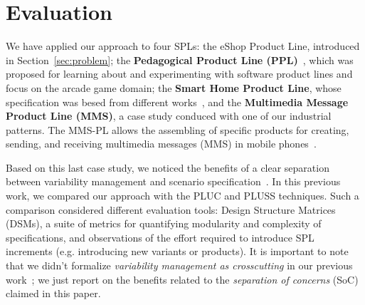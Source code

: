 \documentclass{acm_proc_article-sp}
\begin{document}
% 
% 
% 
% 


\section{Evaluation}
\label{sec:evaluation}

We have applied our approach to four SPLs: the eShop Product Line, introduced in
Section~\ref{sec:problem}; the {\bf Pedagogical Product Line
(PPL)}~\cite{ppl-url}, which was proposed for learning about and experimenting
with software product lines and focus on the arcade game domain; the {\bf Smart
Home Product Line}, whose specification was besed from different
works~\cite{Pohl:2005aa}, and the {\bf Multimedia Message Product Line (MMS)},
a case study conduced with one of our industrial patterns. The MMS-PL allows the
assembling of specific products for creating, sending, and receiving multimedia
messages (MMS) in mobile phones~\cite{Bonifacio:2008aa}.

Based on this last case study, we noticed the benefits of a clear separation
between variability management and scenario
specification~\cite{Bonifacio:2008aa}. In this previous work, we compared our
approach with the PLUC and PLUSS techniques. Such a comparison considered
different evaluation tools: Design Structure Matrices (DSMs), a suite of metrics
for quantifying modularity and complexity of specifications, and observations of
the effort required to introduce SPL increments (e.g. introducing new variants or
products). It is important to note that we didn't formalize \emph{variability
management as crosscutting} in our previous work~\cite{Bonifacio:2008aa}; we just
report on the benefits related to the \emph{separation of concerns} (SoC) claimed
in this paper.
\end{document}
